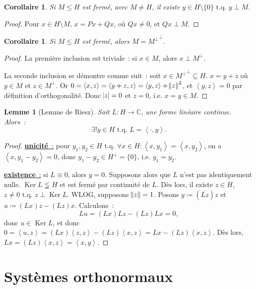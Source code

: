 \documentclass{report}
\DeclareMathOperator{\Ker}{Ker}
\newcommand{\C}{{\mathbb C}}
\newcommand{\scpr}[2]{\left\langle#1, #2\right\rangle}
\newcommand{\tq}{\text{ t.q. }}
\newcommand{\unic}{{\underline {\textbf{unicité}~:}} }
\newcommand{\exis}{{\underline {\textbf{existence}~:}} }
\newtheorem{cor}[thm]{Corollaire}
\newtheorem{lem}[thm]{Lemme}
\theoremstyle{definition}
\theoremstyle{remark}
\newtheorem*{rmq}{Remarque}
\begin{document}
\begin{cor}\label{cor:sous-espace vectoriel fermé admet un orthogonal} Si $M \leq H$ est fermé, avec $M \neq H$, il existe $y \in H \setminus \{0\} \tq y \perp M$.
\end{cor}

\begin{proof} Pour $x \in H \setminus M$, $x = Px+Qx$, où $Qx \neq 0$, et $Qx \perp M$.
\end{proof}


\begin{cor} Si $M \leq H$ est fermé, alors $M = {M^\perp}^\perp$.
\end{cor}

\begin{proof} La première inclusion est triviale~: si $x \in M$, alors $x \perp M^\perp$.

La seconde inclusion se démontre comme suit~: soit $x \in {M^\perp}^\perp \subseteq H$. $x = y+z$ où $y \in M$ et $z \in M^\perp$.
Or $0 = \scpr xz = \scpr {y+z}z = \scpr yz + \norm z^2$, et $\scpr yz = 0$ par définition d'orthogonalité. Donc $\abs z = 0$ et $z=0$, i.e. $x=y \in M$.
\end{proof}

\begin{lem}[Lemme de Riesz]\label{lem:Riesz} Soit $L : H \to \C$, une forme linéaire continue. Alors~:
\[\exists! y \in H \tq L = \scpr \cdot y.\]
\end{lem}

\begin{proof} \unic pour $y_1, y_2 \in H \tq \forall x \in H : \scpr x{y_1} = \scpr x{y_2}$, on a $\scpr x{y_1-y_2} = 0$, donc $y_1-y_2 \in H^\perp = \{0\}$, i.e. $y_1=y_2$.

\exis si $L \equiv 0$, alors $y=0$. Supposons alors que $L$ n'est pas identiquement nulle. $\Ker L \lneqq H$ et est fermé par continuité de $L$. Dès lors, il existe $z \in H$,
$z \neq 0 \tq z \perp \Ker L$. WLOG, supposons $\norm z = 1$. Posons $y \coloneqq (\overline {Lz})z$ et $u \coloneqq (Lx)z - (Lz)x$. Calculons~:
\[Lu = (Lx)Lz - (Lz)Lx = 0,\]
donc $u \in \Ker L$, et donc $0 = \scpr uz = (Lx)\scpr zz - (Lz)\scpr xz = Lx-(Lz)\scpr xz$. Dès lors, $Lx = (Lz)\scpr xz = \scpr xy$.
\end{proof}

\section{Systèmes orthonormaux}
\end{document}
